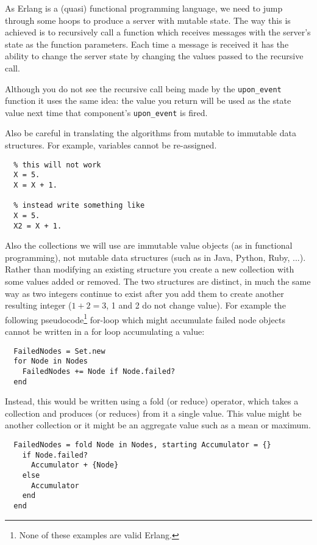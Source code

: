 \documentclass[a4paper]{article}
\begin{document}
As Erlang is a (quasi) functional programming language, we need to jump
through some hoops to produce a server with mutable state. The way this is
achieved is to recursively call a function which receives messages with the
server's state as the function parameters. Each time a message is received
it has the ability to change the server state by changing the values passed
to the recursive call.

Although you do not see the recursive call being made by the \verb!upon_event!
function it uses the same idea: the value you return will be used as the
state value next time that component's \verb!upon_event! is fired.

Also be careful in translating the algorithms from mutable to immutable data
structures. For example, variables cannot be re-assigned.

\begin{verbatim}
  % this will not work
  X = 5.
  X = X + 1.

  % instead write something like
  X = 5.
  X2 = X + 1.
\end{verbatim}

Also the collections we will use are immutable value objects (as in functional
programming), not mutable data structures (such as in Java, Python, Ruby,
...). Rather than modifying an existing structure you create a new collection
with some values added or removed. The two structures are distinct, in much
the same way as two integers continue to exist after you add them to create
another resulting integer ($1+2=3$, 1 and 2 do not change value). For example
the following pseudocode\footnote{None of these examples are valid Erlang.}
for-loop which might accumulate failed node objects cannot be written in a for
loop accumulating a value:

\begin{verbatim}
  FailedNodes = Set.new
  for Node in Nodes
    FailedNodes += Node if Node.failed?
  end
\end{verbatim}

Instead, this would be written using a fold (or reduce) operator, which
takes a collection and produces (or reduces) from it a single value. This
value might be another collection or it might be an aggregate value such as
a mean or maximum.

\begin{verbatim}
  FailedNodes = fold Node in Nodes, starting Accumulator = {}
    if Node.failed?
      Accumulator + {Node}
    else
      Accumulator
    end
  end
\end{verbatim}
\end{document}
